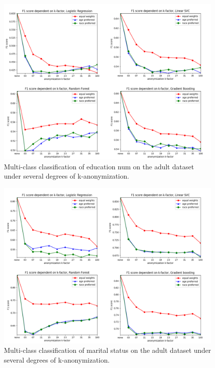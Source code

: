 \documentclass{llncs}
\begin{document}
\begin{figure}[!h]
	\centering
	\includegraphics[width=1\textwidth]{figures/anonymization/adults_education_num/anon_education_combined}
	\caption{Multi-class classification of education num on the adult dataset under several degrees of k-anonymization.}
	\label{fig:results_anonymization_education_num}
\end{figure}


\begin{figure}[!h]
	\centering
	\includegraphics[width=1\textwidth]{figures/anonymization/adults_marital_status/anon_marital_combined}
	\caption{Multi-class classification of marital status on the adult dataset under several degrees of k-anonymization.}
	\label{fig:results_anonymization_marital_status}
\end{figure}
\end{document}

